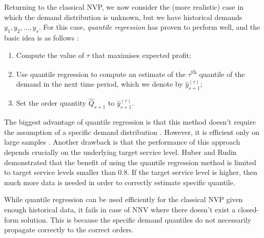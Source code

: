 \documentclass{article}
\begin{document}
Returning to the classical NVP, we now consider the (more realistic) case in which the demand distribution is unknown, but we have historical demands $y_1,y_2,\dots,y_s$.
For this case, \emph{quantile regression}
has proven to perform well, and the basic idea is as follows \cite{BT06,Br16,CS19,HNS15,Hu19}:
\begin{enumerate}
\item Compute the value of $\tau$ that maximises expected profit;
\item Use quantile regression to compute an estimate of the $\tau$\textsuperscript{th} quantile of the demand in the next time period, which we denote by $\hat{y}_{s+1}^{(\tau)}$;
\item Set the order quantity $\hat{Q}_{s+1}$ to $\hat{y}_{s+1}^{(\tau)}$.
\end{enumerate}

The biggest advantage of quantile regression is that this method doesn't require the assumption of a specific demand distribution \cite{Hu19}. However, it is efficient only on large samples \cite{Hu19,RV19}. Another drawback is that the performance of this approach depends crucially on the underlying target service level. Huber \cite{Hu19} and Rudin \cite{RV19} demonstrated that the benefit of using the quantile regression method is limited to target service levels smaller than 0.8. If the target service level is higher, then much more data is needed in order to correctly estimate specific quantile.

While quantile regression can be used efficiently for the classical NVP given enough historical data, it fails in case of NNV where there doesn't exist a closed-form solution. This is because the specific demand quantiles do not necessarily propagate correctly to the correct orders.


\end{document}
